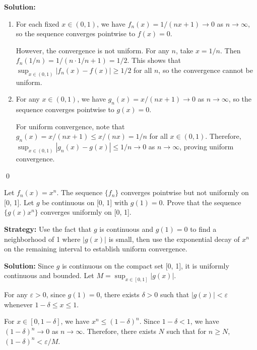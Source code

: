 \bigskip\noindent\textbf{Solution:}
\begin{enumerate}[label=(\alph*)]
\item For each fixed \( x \in (0, 1) \), we have \( f_n(x) = 1/(nx + 1) \to 0 \) as \( n \to \infty \), so the sequence converges pointwise to \( f(x) = 0 \).

However, the convergence is not uniform. For any \( n \), take \( x = 1/n \). Then \( f_n(1/n) = 1/(n \cdot 1/n + 1) = 1/2 \). This shows that \( \sup_{x \in (0,1)} |f_n(x) - f(x)| \geq 1/2 \) for all \( n \), so the convergence cannot be uniform.

\item For any \( x \in (0, 1) \), we have \( g_n(x) = x/(nx + 1) \to 0 \) as \( n \to \infty \), so the sequence converges pointwise to \( g(x) = 0 \).

For uniform convergence, note that \( g_n(x) = x/(nx + 1) \leq x/(nx) = 1/n \) for all \( x \in (0, 1) \). Therefore, \( \sup_{x \in (0,1)} |g_n(x) - g(x)| \leq 1/n \to 0 \) as \( n \to \infty \), proving uniform convergence.
\end{enumerate}\qed


\begin{problembox}
\begin{problemstatement}
Let \( f_n(x) = x^n \). The sequence \( \{f_n\} \) converges pointwise but not uniformly on [0, 1]. Let \( g \) be continuous on [0, 1] with \( g(1) = 0 \). Prove that the sequence \( \{g(x)x^n\} \) converges uniformly on [0, 1].
\end{problemstatement}
\end{problembox}

\noindent\textbf{Strategy:} Use the fact that \( g \) is continuous and \( g(1) = 0 \) to find a neighborhood of 1 where \( |g(x)| \) is small, then use the exponential decay of \( x^n \) on the remaining interval to establish uniform convergence.

\bigskip\noindent\textbf{Solution:} Since \( g \) is continuous on the compact set [0, 1], it is uniformly continuous and bounded. Let \( M = \sup_{x \in [0,1]} |g(x)| \).

For any \( \varepsilon > 0 \), since \( g(1) = 0 \), there exists \( \delta > 0 \) such that \( |g(x)| < \varepsilon \) whenever \( 1 - \delta \leq x \leq 1 \).

For \( x \in [0, 1 - \delta] \), we have \( x^n \leq (1 - \delta)^n \). Since \( 1 - \delta < 1 \), we have \( (1 - \delta)^n \to 0 \) as \( n \to \infty \). Therefore, there exists \( N \) such that for \( n \geq N \), \( (1 - \delta)^n < \varepsilon/M \).

